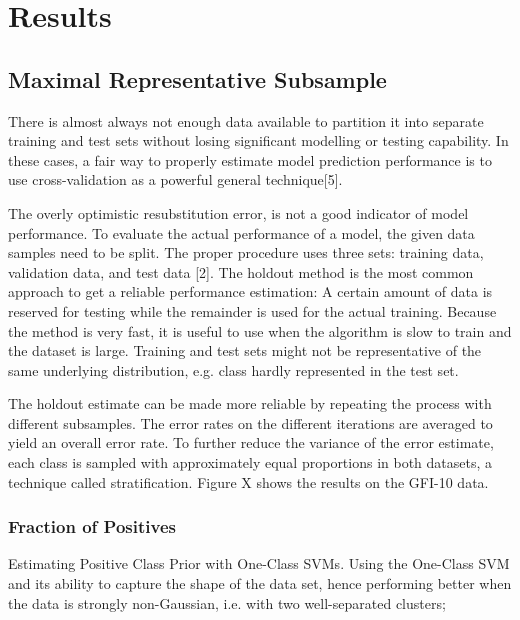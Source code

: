 \chapter{Results}\label{Sec:Results}

\section{Maximal Representative Subsample}
 
There is almost always not enough data available to partition it into separate training and test sets without losing signiﬁcant modelling or testing capability. In these cases, a fair way to properly estimate model prediction performance is to use cross-validation as a powerful general technique[5].

The overly optimistic resubstitution error, is not a good indicator of model performance. To evaluate the actual performance of a model, the given data samples need to be split. The proper procedure uses three sets: training data, validation data, and test data [2]. The holdout method is the most common approach to get a reliable performance estimation: A certain amount of data is reserved for testing while the remainder is used for the actual training. Because the method is very fast, it is useful to use when the algorithm is slow to train and the dataset is large. Training and test sets might not be representative of the same underlying distribution, e.g. class hardly represented in the test set.

The holdout estimate can be made more reliable by repeating the process with different subsamples. The error rates on the different iterations are averaged to yield an overall error rate. To further reduce the variance of the error estimate, each class is sampled with approximately equal proportions in both datasets, a technique called stratiﬁcation. Figure X shows the results on the GFI-10 data.

\subsection{Fraction of Positives}

Estimating Positive Class Prior with One-Class SVMs. Using the One-Class SVM and its ability to capture the shape of the data set, hence performing better when the data is strongly non-Gaussian, i.e. with two well-separated clusters;

